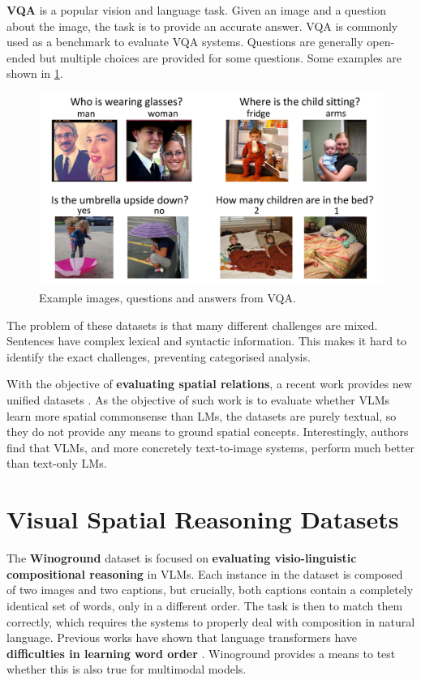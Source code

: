 \textbf{VQA} \cite{antol2015vqa} is a popular vision and language task. Given an image and a question about the image, the task is to provide an accurate answer. VQA is commonly used as a benchmark to evaluate VQA systems. Questions are generally open-ended but multiple choices are provided for some questions. Some examples are shown in \cref{fig:vqa_examples}.

\begin{figure}[ht]
    \centering
    \includegraphics[width=\linewidth]{images/datasets/vqa_examples.pdf}
    \caption{Example images, questions and answers from VQA.}
    \label{fig:vqa_examples}
\end{figure}

The problem of these datasets is that many different challenges are mixed. Sentences have complex lexical and syntactic information. This makes it hard to identify the exact challenges, preventing categorised analysis.

With the objective of \textbf{evaluating spatial relations}, a recent work provides new unified datasets \cite{liu2022things}. As the objective of such work is to evaluate whether VLMs learn more spatial commonsense than LMs, the datasets are purely textual, so they do not provide any means to ground spatial concepts. Interestingly, authors find that VLMs, and more concretely text-to-image systems, perform much better than text-only LMs.

\section{Visual Spatial Reasoning Datasets} \label{sec:spatial_reasoning_datasets}

The \textbf{Winoground} dataset \cite{thrush2022winoground} is focused on \textbf{evaluating visio-linguistic compositional reasoning} in VLMs. Each instance in the dataset is composed of two images and two captions, but crucially, both captions contain a completely identical set of words, only in a different order. The task is then to match them correctly, which requires the systems to properly deal with composition in natural language. Previous works have shown that language transformers have \textbf{difficulties in learning word order} \cite{sinha2020unnatural,sinha2021matterslittle}. Winoground provides a means to test whether this is also true for multimodal models.

